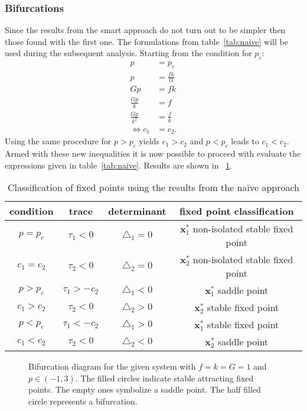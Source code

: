 \subsubsection{Bifurcations}
Since the results from the smart approach do not turn out to be simpler then those found with the first one. The formulations from table~\ref{tab:naive} will be used during the subsequent analysis. Starting from the condition for $p_c$:
\begin{align}
p &= p_c \\
p &= \frac{fk}{G} \\
Gp &= fk \\
\frac{Gp}{k} &= f \\
\frac{Gp}{k^2} &= \frac{f}{k} \\
\Leftrightarrow c_1 &= c_2 .
\end{align}
Using the same procedure for $p > p_c$ yields $c_1 > c_2$ and $p < p_c$ leads to $c_1 < c_2$. Armed with these new inequalities it is now possible to proceed with evaluate the expressions given in table~\ref{tab:naive}. Results are shown in ~\ref{tab:analysis}.
\begin{table}
\centering
\begin{tabular}{|c|c|c|c|}
\hline
condition   & trace		   & determinant 		& fixed point classification \\
\hline
$p = p_c  $ & $\tau_1 < 0$ & $\triangle_1 = 0 $ & $\mathbf{x}_1^*$ non-isolated stable fixed point \\
$c_1 = c_2$ & $\tau_2 < 0$ & $\triangle_2 = 0 $ & $\mathbf{x}_2^*$ non-isolated stable fixed point \\
\hline
$p > p_c  $ & $\tau_1 > -c_2$ & $\triangle_1 < 0 $ & $\mathbf{x}_1^*$ saddle point \\
$c_1 > c_2$ & $\tau_2 < 0$    & $\triangle_2 > 0 $ & $\mathbf{x}_2^*$ stable fixed point \\
\hline
$p < p_c  $ & $\tau_1 < -c_2$ & $\triangle_1 > 0 $ & $\mathbf{x}_1^*$ stable fixed point \\
$c_1 < c_2$ & $\tau_2 < 0$    & $\triangle_2 < 0 $ & $\mathbf{x}_2^*$ saddle point \\
\hline
\end{tabular}
\caption{Classification of fixed points using the results from the na\"{i}ve approach}
\label{tab:analysis}
\end{table}
\begin{figure}

\caption{Bifurcation diagram for the given system with $f=k=G=1$ and $p \in (-1,3)$. The filled circles indicate stable attracting fixed points. The empty ones symbolize a saddle point. The half filled circle represents a bifurcation.}
\end{figure}



